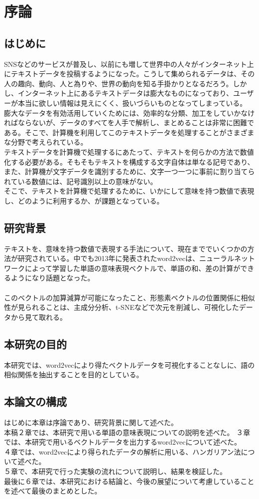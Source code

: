 \chapter{序論}

\section{はじめに}
SNSなどのサービスが普及し、以前にも増して世界中の人々がインターネット上にテキストデータを投稿するようになった。こうして集められるデータは、その人の趣向、動向、人と為りや、世界の動向を知る手掛かりとなるだろう。しかし、インターネット上にあるテキストデータは膨大なものになっており、ユーザーが本当に欲しい情報は見えにくく、扱いづらいものとなってしまっている。\\
膨大なデータを有効活用していくためには、効率的な分類、加工をしていかなければならないが、データのすべてを人手で解析し、まとめることは非常に困難である。そこで、計算機を利用してこのテキストデータを処理することがさまざまな分野で考えられている。
\\
テキストデータを計算機で処理するにあたって、テキストを何らかの方法で数値化する必要がある。そもそもテキストを構成する文字自体は単なる記号であり、また、計算機が文字データを識別するために、文字一つ一つに事前に割り当てられている数値には、記号識別以上の意味がない。\\
そこで、テキストを計算機で処理するために、いかにして意味を持つ数値で表現し、どのように利用するか、が課題となっている。
\\
\section{研究背景}
テキストを、意味を持つ数値で表現する手法について、現在まででいくつかの方法が研究されている。中でも2013年に発表されたword2vecは、ニューラルネットワークによって学習した単語の意味表現ベクトルで、単語の和、差の計算ができるようになり話題となった。\\
\\
このベクトルの加算減算が可能になったこと、形態素ベクトルの位置関係に相似性が見られることは、主成分分析、t-SNEなどで次元を削減し、可視化したデータから見て取れる。
\\
\section{本研究の目的}
本研究では、word2vecにより得たベクトルデータを可視化することなしに、語の相似関係を抽出することを目的としている。
\\
\section{本論文の構成}
はじめに本章は序論であり、研究背景に関して述べた。\\
本稿２章では、本研究で用いる単語の意味表現についての説明を述べた。
３章では、本研究で用いるベクトルデータを出力するword2vecについて述べた。\\
４章では、word2vecにより得られたデータの解析に用いる、ハンガリアン法について述べた。\\
５章で、本研究で行った実験の流れについて説明し、結果を検証した。\\
最後に６章では、本研究における結論と、今後の展望について考慮していることを述べて最後のまとめとした。\\
